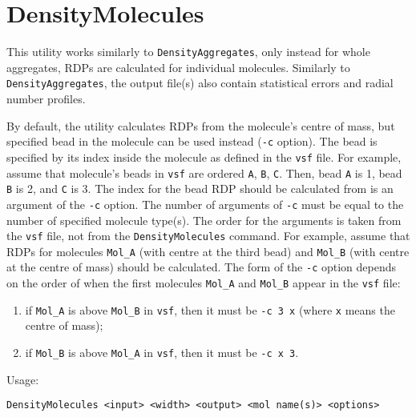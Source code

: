 \section{DensityMolecules} \label{sec:DensityMolecules}

This utility works similarly to \texttt{DensityAggregates}, only instead
for whole aggregates, RDPs are calculated for individual molecules.
Similarly to \texttt{DensityAggregates}, the output file(s) also contain
statistical errors and radial number profiles.

By default, the utility calculates RDPs from the molecule's centre of mass,
but specified bead in the molecule can be used instead (\texttt{-c}
option). The bead is specified by its index inside the molecule as defined
in the \texttt{vsf} file. For example, assume that molecule's beads in
\texttt{vsf} are ordered \texttt{A}, \texttt{B}, \texttt{C}. Then, bead
\texttt{A} is 1, bead \texttt{B} is 2, and \texttt{C} is 3. The index for
the bead RDP should be calculated from is an argument of the \texttt{-c}
option. The number of arguments of \texttt{-c} must be equal to the number
of specified molecule type(s). The order for the arguments is taken from
the \texttt{vsf} file, not from the \texttt{DensityMolecules} command. For
example, assume that RDPs for molecules \texttt{Mol\_A} (with centre at the
third bead) and \texttt{Mol\_B} (with centre at the centre of mass) should
be calculated. The form of the \texttt{-c} option depends on the order of
when the first molecules \texttt{Mol\_A} and \texttt{Mol\_B} appear in the
\texttt{vsf} file:
\begin{enumerate}[nosep]
  \item if \texttt{Mol\_A} is above \texttt{Mol\_B} in \texttt{vsf}, then
    it must be \texttt{-c 3 x} (where \texttt{x} means the centre of mass);
  \item if \texttt{Mol\_B} is above \texttt{Mol\_A} in \texttt{vsf}, then
    it must be \texttt{-c x 3}.
\end{enumerate}

Usage:

\vspace{1em}
\noindent
\texttt{DensityMolecules <input> <width> <output> <mol name(s)> <options>}

